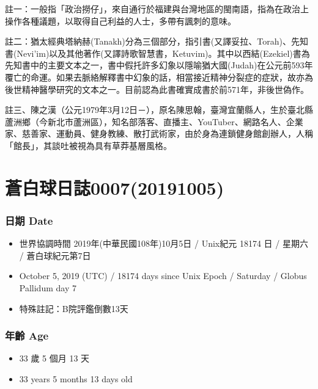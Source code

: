 \documentclass[a5paper, 12pt
]{book}
\providecommand{\tightlist}{%
  \setlength{\itemsep}{0pt}\setlength{\parskip}{0pt}}
\begin{document}
註一：一般指「政治撈仔」，來自通行於福建與台灣地區的閩南語，指為在政治上操作各種議題，以取得自己利益的人士，多帶有諷刺的意味。

註二：猶太經典塔納赫(Tanakh)分為三個部分，指引書(又譯妥拉、Torah)、先知書(Nevi'im)以及其他著作(又譯詩歌智慧書，Ketuvim)。其中以西結(Ezekiel)書為先知書中的主要文本之一，書中假托許多幻象以隱喻猶大國(Judah)在公元前593年覆亡的命運。如果去脈絡解釋書中幻象的話，相當接近精神分裂症的症狀，故亦為後世精神醫學研究的文本之一。目前認為此書確實成書於前571年，非後世偽作。

註三、陳之漢（公元1979年3月12日－），原名陳思翰，臺灣宜蘭縣人，生於臺北縣蘆洲鄉（今新北市蘆洲區），知名部落客、直播主、YouTuber、網路名人、企業家、慈善家、運動員、健身教練、散打武術家，由於身為連鎖健身館創辦人，人稱「館長」，其談吐被視為具有草莽基層風格。

\hypertarget{ux84bcux767dux7403ux65e5ux8a8c000720191005}{%
\section{蒼白球日誌0007(20191005)}\label{ux84bcux767dux7403ux65e5ux8a8c000720191005}}

\hypertarget{ux65e5ux671f-date-4}{%
\subsubsection{日期 Date}\label{ux65e5ux671f-date-4}}

\begin{itemize}
\tightlist
\item
  世界協調時間 2019年(中華民國108年)10月5日 / Unix紀元 18174 日 / 星期六
  / 蒼白球紀元第7日
\item
  October 5, 2019 (UTC) / 18174 days since Unix Epoch / Saturday /
  Globus Pallidum day 7
\item
  特殊註記：B院評鑑倒數13天
\end{itemize}

\hypertarget{ux5e74ux9f61-age-4}{%
\subsubsection{年齡 Age}\label{ux5e74ux9f61-age-4}}

\begin{itemize}
\tightlist
\item
  33 歲 5 個月 13 天
\item
  33 years 5 months 13 days old
\end{itemize}
\end{document}
